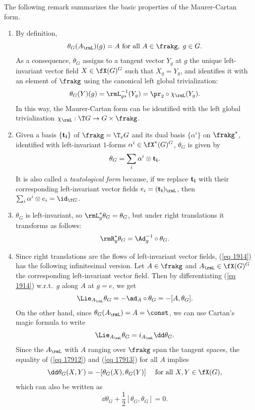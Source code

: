 The following remark summarizes the basic properties of the Maurer-Cartan form.

\begin{rem}
    \begin{enumerate}
        \item By definition,
        \[\theta_G(A_\rmL)(g)=A\text{ for all }A\in\frakg,\; g\in G.\]
        As a consequence, $\theta_G$ assigns to a tangent vector $Y_g$ at $g$ the unique left-invariant vector field $X\in\fX(G)^G$ such that $X_g=Y_g$, and identifies it with an element of $\frakg$ using the canonical left global trivialization:
        \[\theta_G(Y)(g)=\rmL_{g\ast}^{-1}(Y_g)=\pr_2\circ \chi_\rmL(Y_g).\]
        In this way, the Maurer-Cartan form can be identified with the left global trivialization $\chi_\rmL:\T G\to G\times\frakg$.
        \item Given a basis $\{\bf{t}_i\}$ of $\frakg=\T_eG$ and its dual basis $\{\alpha^i\}$ on $\frakg^\ast$, identified with left-invariant $1$-forms $\alpha^i\in\fX^\ast(G)^G$, $\theta_G$ is given by
        \[\theta_G=\sum_i \alpha^i\otimes \bf{t}_i.\]
        It is also called a \emph{tautological form} because, if we replace $\bf{t}_i$ with their corresponding left-invariant vector fields $e_i=(\bf{t}_i)_\rmL$, then $\sum_i \alpha^i\otimes e_i=\id_{\T G}$.
        \item $\theta_G$ is left-invariant, so $\rmL_g^\ast\theta_G=\theta_G$, but under right translations it transforms as follows:
        \[\rmR_g^\ast\theta_G=\Ad_g^{-1}\circ\theta_G.\label{eq 1914}\]
        \item Since right translations are the flows of left-invariant vector fields, (\ref{eq 1914}) has the following infinitesimal version. Let $A\in\frakg$ and $A_\rmL\in\fX(G)^G$ the corresponding left-invariant vector field. Then by differentiating (\ref{eq 1914}) w.r.t.\ $g$ along $A$ at $g=e$, we get 
        \[\Lie_{A_\rmL}\theta_G=-\ad_A\circ\theta_G=-[A,\theta_G].\label{eq 17912}\]
        On the other hand, since $\theta_G(A_\rmL)=A=\const$, we can use Cartan's magic formula to write
        \[\Lie_{A_\rmL}\theta_G=i_{A_\rmL}\dd\theta_G.\label{eq 17913}\]
        Since the $A_\rmL$ with $A$ ranging over $\frakg$ span the tangent spaces, the equality of (\ref{eq 17912}) and (\ref{eq 17913}) for all $A$ implies
        \[\dd\theta_G(X,Y)=-[\theta_G(X),\theta_G(Y)]\quad \text{ for all } X,Y\in\fX(G),\]
        which can also be written as
        \[\boxed{\dd\theta_G +\frac12 [\theta_G,\theta_G]=0.}\label{eq 5.5.10 RS1 maurer-cartan}\]

\end{enumerate}
\end{rem}

